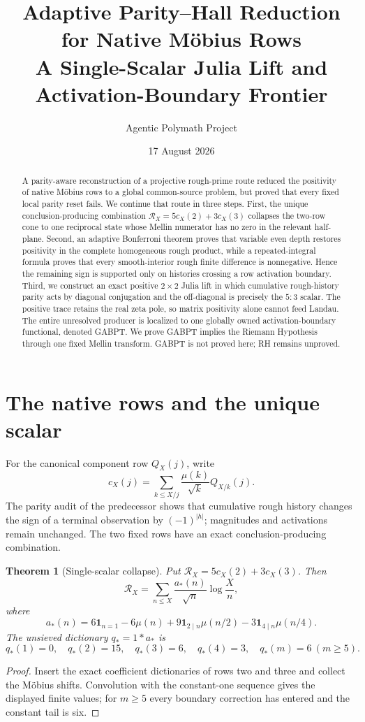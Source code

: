 \documentclass[11pt]{article}
\title{Adaptive Parity--Hall Reduction for Native M\"obius Rows\\\large A Single-Scalar Julia Lift and Activation-Boundary Frontier}
\author{Agentic Polymath Project}
\date{17 August 2026}
\newtheorem{theorem}{Theorem}[section]
\newcommand{\1}{\mathbf 1}
\newcommand{\RR}{\mathcal R}
\begin{document}
\maketitle
\begin{abstract}
A parity-aware reconstruction of a projective rough-prime route reduced the
positivity of native M\"obius rows to a global common-source problem, but proved
that every fixed local parity reset fails. We continue that route in three
steps. First, the unique conclusion-producing combination
\(\RR_X=5c_X(2)+3c_X(3)\) collapses the two-row cone to one reciprocal state
whose Mellin numerator has no zero in the relevant half-plane. Second, an
adaptive Bonferroni theorem proves that variable even depth restores positivity
in the complete homogeneous rough product, while a repeated-integral formula
proves that every smooth-interior rough finite difference is nonnegative.
Hence the remaining sign is supported only on histories crossing a row
activation boundary. Third, we construct an exact positive \(2\times2\) Julia
lift in which cumulative rough-history parity acts by diagonal conjugation and
the off-diagonal is precisely the \(5{:}3\) scalar. The positive trace retains
the real zeta pole, so matrix positivity alone cannot feed Landau. The entire
unresolved producer is localized to one globally owned activation-boundary
functional, denoted GABPT. We prove GABPT implies the Riemann Hypothesis through
one fixed Mellin transform. GABPT is not proved here; RH remains unproved.
\end{abstract}
\begin{center}\end{center}
\tableofcontents

\section{The native rows and the unique scalar}
For the canonical component row \(Q_X(j)\), write
\[
c_X(j)=\sum_{k\le X/j}\frac{\mu(k)}{\sqrt{k}}Q_{X/k}(j).
\]
The parity audit of the predecessor shows that cumulative rough history changes
the sign of a terminal observation by \((-1)^{|h|}\); magnitudes and activations
remain unchanged. The two fixed rows have an exact conclusion-producing
combination.

\begin{theorem}[Single-scalar collapse]\label{thm:scalar}
Put \(\RR_X=5c_X(2)+3c_X(3)\). Then
\[
\RR_X=\sum_{n\le X}\frac{a_*(n)}{\sqrt n}\log\frac Xn,
\]
where
\[
a_*(n)=6\1_{n=1}-6\mu(n)+9\1_{2\mid n}\mu(n/2)
-3\1_{4\mid n}\mu(n/4).
\]
The unsieved dictionary \(q_*=1*a_*\) is
\[
q_*(1)=0,\quad q_*(2)=15,\quad q_*(3)=6,\quad q_*(4)=3,
\quad q_*(m)=6\ (m\ge5).
\]
\end{theorem}
\begin{proof}
Insert the exact coefficient dictionaries of rows two and three and collect the
M\"obius shifts. Convolution with the constant-one sequence gives the displayed
finite values; for \(m\ge5\) every boundary correction has entered and the
constant tail is six.
\end{proof}
\end{document}
